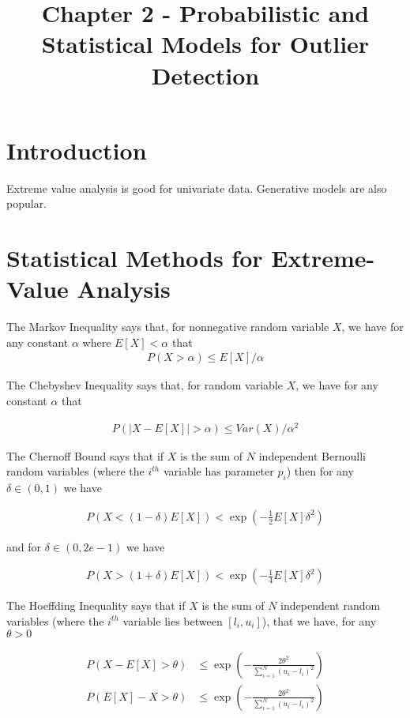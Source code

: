 \documentclass[a4paper]{article}
\title{Chapter 2 - Probabilistic and Statistical Models for Outlier Detection}
\date{}
\begin{document}
\maketitle

\section{Introduction}
Extreme value analysis is good for univariate data. Generative models are also
popular.
\section{Statistical Methods for Extreme-Value Analysis}
The Markov Inequality says that, for nonnegative random variable $X$, we have
for any constant $\alpha$ where $E[X] < \alpha$ that
\begin{align}
  P(X > \alpha) \leq E[X]/\alpha
\end{align}

The Chebyshev Inequality says that, for random variable $X$, we have for any
constant $\alpha$ that

\begin{align}
  P(|X - E[X]| > \alpha) \leq Var(X)/\alpha^2
\end{align}

The Chernoff Bound says that if $X$ is the sum of $N$ independent
Bernoulli random variables (where the $i^{th}$ variable has parameter $p_i$)
then for any $\delta \in (0, 1)$ we have

\begin{align}
  P(X < (1 - \delta) E[X]) < \exp(-\frac{1}{2} E[X] \delta^2)
\end{align}

and for $\delta \in (0, 2e - 1)$ we have

\begin{align}
  P(X > (1 + \delta) E[X]) < \exp(-\frac{1}{4} E[X] \delta^2)
\end{align}

The Hoeffding Inequality says that if $X$ is the sum of $N$ independent
random variables (where the $i^{th}$ variable lies between $[l_i, u_i]$), that
we have, for any $\theta > 0$

\begin{align}
  P(X - E[X] > \theta) &\leq \exp(-\frac{2 \theta^2}{\sum_{i=1}^{N}{(u_i - l_i)^2}}) \\
  P(E[X] - X > \theta) &\leq \exp(-\frac{2 \theta^2}{\sum_{i=1}^{N}{(u_i - l_i)^2}})
\end{align}
\end{document}
